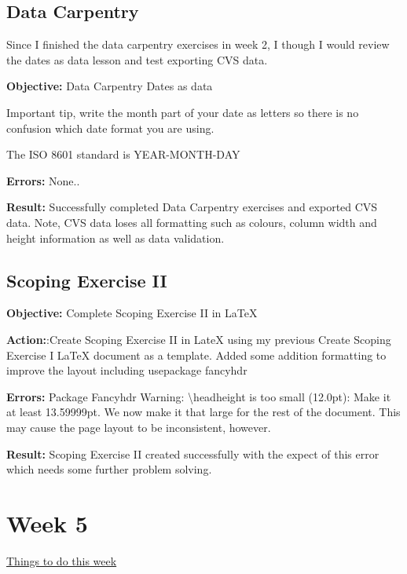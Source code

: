 \documentclass[a4paper,11pt]{article}
\begin{document}
\subsection{Data Carpentry}

Since I finished the data carpentry exercises in week 2, I though I would review the dates as data lesson and test exporting CVS data.

\noindent \textbf{Objective:} Data Carpentry Dates as data

Important tip, write the month part of your date as letters so there is no confusion which date format you are using. 

The ISO 8601 standard is YEAR-MONTH-DAY

\noindent \textbf{Errors:} None..

\noindent \textbf{Result:} Successfully completed Data Carpentry exercises and exported CVS data. Note, CVS data loses all formatting such as colours, column width and height information as well as data validation. 

\subsection{Scoping Exercise II}

\noindent \textbf{Objective:} Complete Scoping Exercise II in LaTeX

\noindent \textbf{Action:}:Create Scoping Exercise II in LateX using my previous Create Scoping Exercise I LaTeX document as a template. Added some addition formatting to improve the layout including usepackage fancyhdr

\noindent \textbf{Errors:} Package Fancyhdr Warning: \textbackslash headheight is too small (12.0pt): Make it at least 13.59999pt. We now make it that large for the rest of the document. This may cause the page layout to be inconsistent, however.

\noindent \textbf{Result:} Scoping Exercise II created successfully with the expect of this error which needs some further problem solving.
 
\newpage

\section{Week 5}

\underline {Things to do this week}
 
\end{document}
